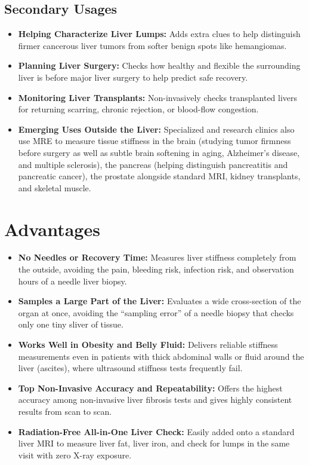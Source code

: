 \subsection{Secondary Usages}
\begin{itemize}
\item \textbf{Helping Characterize Liver Lumps:} Adds extra clues to help distinguish firmer cancerous liver tumors from softer benign spots like hemangiomas.
\item \textbf{Planning Liver Surgery:} Checks how healthy and flexible the surrounding liver is before major liver surgery to help predict safe recovery.
\item \textbf{Monitoring Liver Transplants:} Non-invasively checks transplanted livers for returning scarring, chronic rejection, or blood-flow congestion.
\item \textbf{Emerging Uses Outside the Liver:} Specialized and research clinics also use MRE to measure tissue stiffness in the brain (studying tumor firmness before surgery as well as subtle brain softening in aging, Alzheimer's disease, and multiple sclerosis), the pancreas (helping distinguish pancreatitis and pancreatic cancer), the prostate alongside standard MRI, kidney transplants, and skeletal muscle.
\end{itemize}

\section{Advantages}
\begin{itemize}
\item \textbf{No Needles or Recovery Time:} Measures liver stiffness completely from the outside, avoiding the pain, bleeding risk, infection risk, and observation hours of a needle liver biopsy.
\item \textbf{Samples a Large Part of the Liver:} Evaluates a wide cross-section of the organ at once, avoiding the ``sampling error'' of a needle biopsy that checks only one tiny sliver of tissue.
\item \textbf{Works Well in Obesity and Belly Fluid:} Delivers reliable stiffness measurements even in patients with thick abdominal walls or fluid around the liver (ascites), where ultrasound stiffness tests frequently fail.
\item \textbf{Top Non-Invasive Accuracy and Repeatability:} Offers the highest accuracy among non-invasive liver fibrosis tests and gives highly consistent results from scan to scan.
\item \textbf{Radiation-Free All-in-One Liver Check:} Easily added onto a standard liver MRI to measure liver fat, liver iron, and check for lumps in the same visit with zero X-ray exposure.
\end{itemize}

